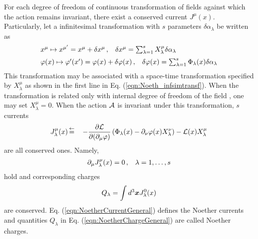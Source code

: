 For each degree of freedom of continuous transformation of fields against which
the action remains invariant, there exist a conserved current $J^\mu (x)$.
Particularly, let a infinitesimal transformation with $s$ parameters $\delta \alpha_\lambda$ be
written as
\begin{eqnarray}
\begin{array}{l}
x^\mu \mapsto x^{\mu '} = x^\mu + \delta x^\mu\,,
\hspace{3mm}
\delta x^\mu = \sum_{\lambda=1}^s X_\lambda^\mu \delta \alpha_\lambda
\vspace{2mm}
\\
\varphi (x) \mapsto \varphi' (x')
=
\varphi(x) + \delta \varphi(x)\,,
\hspace{3mm}
\delta \varphi(x) =
\sum_{\lambda=1}^s \Phi_{ \lambda} (x) \delta \alpha_\lambda
\end{array}
\label{eqn:Noeth_infsimtransf}
\end{eqnarray}
This transformation may be associated with a space-time transformation
specified by $X_\lambda^\mu$ as shown in the first line in Eq. (\ref{eqn:Noeth_infsimtransf}).
When the transformation is related only with  internal degree of freedom of the field , 
one may set $X_\lambda^\mu = 0$.
When the action ${\cal A}$ is invariant under this transformation,
$s$ currents
\begin{eqnarray}
J_\lambda^\mu (x)
&\,\mbox{$\stackrel{\leftarrow}{=}$}\,&
- \frac{\partial {\cal L}}{\partial (\partial_\mu \varphi)}
\left(
\Phi_{\lambda} (x) - \partial_\nu \varphi(x) X_\lambda^\nu 
\right)
-
{\cal L}(x) 
X_\lambda^\mu 
\label{eqn:NoetherCurrentGeneral}
\end{eqnarray}
are all conserved ones. Namely,
\begin{eqnarray}
\partial_\mu J_\lambda^\mu (x) = 0\,,
\hspace{3mm}
\lambda = 1, \dots, s
\end{eqnarray}
hold and corresponding charges
\begin{eqnarray}
Q_\lambda = 
\int d^3 \mbox{\boldmath $x$}
J_\lambda^0 (x)
\label{eqn:NoetherChargeGeneral}
\end{eqnarray}
are conserved.
Eq. (\ref{eqn:NoetherCurrentGeneral}) defines the Noether currents
and quantities $Q_\lambda$ in Eq. (\ref{eqn:NoetherChargeGeneral})
are called Noether charges.

